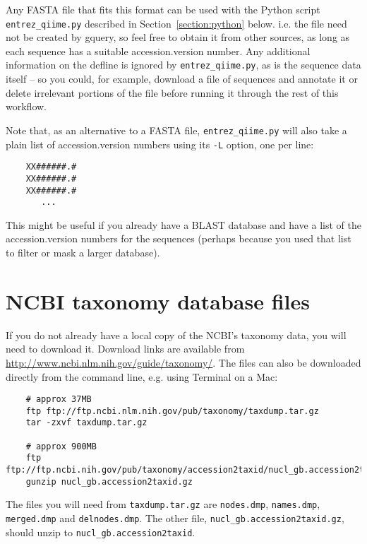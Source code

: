 \documentclass[11pt]{amsart}
\begin{document}
Any FASTA file that fits this format can be used with the Python script \verb|entrez_qiime.py| described in Section~\ref{section:python} below. i.e. the file need not be created by gquery, so feel free to obtain it from other sources, as long as each sequence has a suitable accession.version number. Any additional information on the defline is ignored by \verb|entrez_qiime.py|, as is the sequence data itself -- so you could, for example, download a file of sequences and annotate it or delete irrelevant portions of the file before running it through the rest of this workflow.

Note that, as an alternative to a FASTA file, \verb|entrez_qiime.py| will also take a plain list of accession.version numbers using its \verb|-L| option, one per line:

\begin{verbatim}
    XX######.#
    XX######.#
    XX######.#
       ...
\end{verbatim}

This might be useful if you already have a BLAST database and have a list of the accession.version numbers for the sequences (perhaps because you used that list to filter or mask a larger database).

\section{NCBI taxonomy database files}
\label{section:taxonomy}

If you do not already have a local copy of the NCBI's taxonomy data, you will need to download it. Download links are available from \url{http://www.ncbi.nlm.nih.gov/guide/taxonomy/}. The files can also be downloaded directly from the command line, e.g. using Terminal on a Mac:

\begin{verbatim}
    # approx 37MB
    ftp ftp://ftp.ncbi.nlm.nih.gov/pub/taxonomy/taxdump.tar.gz
    tar -zxvf taxdump.tar.gz
    
    # approx 900MB
    ftp ftp://ftp.ncbi.nih.gov/pub/taxonomy/accession2taxid/nucl_gb.accession2taxid.gz
    gunzip nucl_gb.accession2taxid.gz
\end{verbatim}

The files you will need from \verb|taxdump.tar.gz| are \verb|nodes.dmp|, \verb|names.dmp|, \verb|merged.dmp| and \verb|delnodes.dmp|. The other file, \verb|nucl_gb.accession2taxid.gz|, should unzip to \verb|nucl_gb.accession2taxid|.
\end{document}
